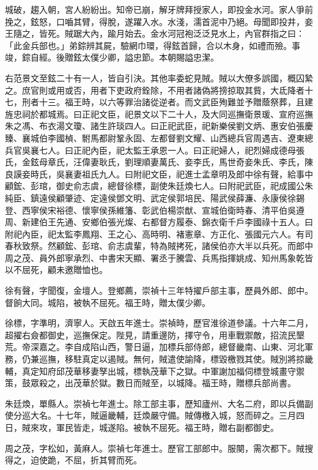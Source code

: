 \begin{pinyinscope}
城破，趨入朝，宮人紛紛出。知帝已崩，解牙牌拜授家人，即投金水河。家人爭前挽之，鉉怒，口嚙其臂，得脫，遂躍入水。水淺，濡首泥中乃絕。母聞即投井，妾王隨之，皆死。賊踞大內，踰月始去。金水河冠袍泛泛見水上，內官群指之曰：「此金兵部也。」弟錝辨其屍，驗網巾環，得鉉首歸，合以木身，如禮而殮。事竣，錝自經。後贈鉉太僕少卿，謚忠節。本朝賜謚忠潔。

右范景文至鉉二十有一人，皆自引決。其他率委蛇見賊。賊以大僚多誤國，概囚縶之。庶官則或用或否，用者下吏政府銓除，不用者諸偽將搒掠取其貲，大氐降者十七，刑者十三。福王時，以六等罪治諸從逆者。而文武臣殉難並予贈蔭祭葬，且建旌忠祠於都城焉。曰正祀文臣，祀景文以下二十人，及大同巡撫衛景瑗、宣府巡撫朱之馮、布衣湯文瓊、諸生許琰四人。曰正祀武臣，祀新樂侯劉文炳、惠安伯張慶臻、襄城伯李國楨、駙馬都尉鞏永固、左都督劉文耀、山西總兵官周遇吉、遼東總兵官吳襄七人。曰正祀內臣，祀太監王承恩一人。曰正祀婦人，祀烈婦成德母張氏，金鉉母章氏，汪偉妻耿氏，劉理順妻萬氏、妾李氏，馬世奇妾朱氏、李氏，陳良謨妾時氏，吳襄妻祖氏九人。曰附祀文臣，祀進士孟章明及郎中徐有聲，給事中顧鋐、彭琯，御史俞志虞，總督徐標，副使朱廷煥七人。曰附祀武臣，祀成國公朱純臣、鎮遠侯顧肇迹、定遠侯鄧文明、武定侯郭培民、陽武侯薛濂、永康侯徐錫登、西寧侯宋裕德、懷寧侯孫維籓、彰武伯楊崇猷、宣城伯衛時春、清平伯吳遵周、新建伯王先通、安鄉伯張光燦、右都督方履泰、錦衣衛千戶李國祿十五人。曰附祀內臣，祀太監李鳳翔、王之心、高時明、褚憲章、方正化、張國元六人。有司春秋致祭。然顧鋐、彭琯、俞志虞輩，特為賊拷死，諸侯伯亦大半以兵死。而郎中周之茂、員外郎寧承烈、中書宋天顯、署丞于騰雲、兵馬指揮姚成、知州馬象乾皆以不屈死，顧未邀贈恤也。

徐有聲，字聞復，金壇人。登鄉薦，崇禎十三年特擢戶部主事，歷員外郎、郎中。督餉大同。城陷，被執不屈死。福王時，贈太僕少卿。

徐標，字準明，濟寧人。天啟五年進士。崇禎時，歷官淮徐道參議。十六年二月，超擢右僉都御史，巡撫保定。陛見，請重邊防，擇守令，用車戰禦敵，招流民墾荒。帝深嘉之。李自成陷山西，警日逼，加標兵部侍郎，總督畿南、山東、河北軍務，仍兼巡撫，移駐真定以遏賊。無何，賊遣使諭降，標毀檄戮其使。賊別將掠畿輔，真定知府邱茂華移妻孥出城，標執茂華下之獄。中軍謝加福伺標登城畫守禦策，鼓眾殺之，出茂華於獄。數日而賊至，以城降。福王時，贈標兵部尚書。

朱廷煥，單縣人。崇禎七年進士。除工部主事，歷知廬州、大名二府，即以兵備副使分巡大名。十七年，賊逼畿輔，廷煥嚴守備。賊傳檄入城，怒而碎之。三月四日，賊來攻，軍民皆走，城遂陷。被執不屈死。福王時，贈右副都御史。

周之茂，字松如，黃麻人。崇禎七年進士。歷官工部郎中。服闋，需次都下。賊搜得之，迫使跪，不屈，折其臂而死。


\end{pinyinscope}
